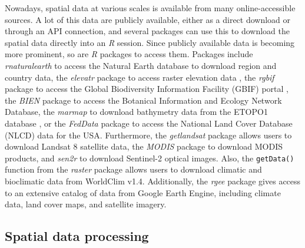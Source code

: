 \documentclass[smallextended]{svjour3}       %
\begin{document}
Nowadays, spatial data at various scales is available from many online-accessible sources.
A lot of this data are publicly available, either as a direct download or through an API connection, and several packages can use this to download the spatial data directly into an \textit{R} session.
Since publicly available data is becoming more prominent, so are \textit{R} packages to access them.
Packages include \textit{rnaturalearth} \cite{South2017} to access the Natural Earth database to download region and country data, the \textit{elevatr} package to access raster elevation data \cite{Hollister2020}, the \textit{rgbif} package to access the Global Biodiversity Information Facility (GBIF) portal \cite{Chamberlain2017}, the \textit{BIEN} package \cite{Maitner2020} to access the Botanical Information and Ecology Network Database, the \textit{marmap} to download bathymetry data from the ETOPO1 database \cite{Pante2013}, or the \textit{FedData} package \cite{Bocinsky2019} to access the National Land Cover Database (NLCD) data for the USA.
Furthermore, the \textit{getlandsat} package \cite{Chamberlain2018} allows users to download Landsat 8 satellite data, the \textit{MODIS} package \cite{Mattiuzzi2020} to download MODIS products, and \textit{sen2r} \cite{Ranghetti2020} to download Sentinel-2 optical images.
Also, the \texttt{getData()} function from the \textit{raster} package allows users to download climatic and bioclimatic data from WorldClim v1.4.
Additionally, the \textit{rgee} package \cite{Aybar2020} gives access to an extensive catalog of data from Google Earth Engine, including climate data, land cover maps, and satellite imagery.

\hypertarget{spatial-data-processing}{%
\subsection{Spatial data processing}\label{spatial-data-processing}}
\end{document}
